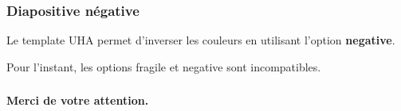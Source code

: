\documentclass[]{beamer}
\begin{document}
\begin{frame}[negative]
	\frametitle{Diapositive négative}
	Le template UHA permet d'inverser les couleurs en utilisant l'option \textbf{negative}.

	\alert{Pour l'instant, les options fragile et negative sont incompatibles.}
\end{frame}


\begin{frame}
	\frametitle{}
	\begin{center}
		\textbf{Merci de votre attention.}
	\end{center}
\end{frame}
\end{document}
